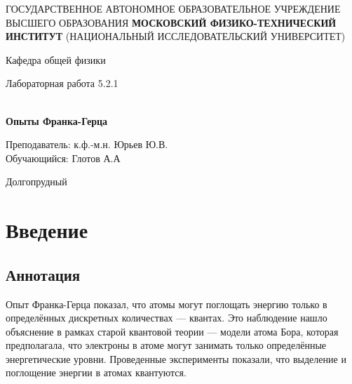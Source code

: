\documentclass[12pt,a4paper]{article}
\author{Глотов Алексей}
\begin{document}
\newpage
\begin{center}
\footnotesize{{ГОСУДАРСТВЕННОЕ АВТОНОМНОЕ ОБРАЗОВАТЕЛЬНОЕ УЧРЕЖДЕНИЕ}\break
{ВЫСШЕГО ОБРАЗОВАНИЯ}
\break
{\bf {МОСКОВСКИЙ ФИЗИКО-ТЕХНИЧЕСКИЙ ИНСТИТУТ}}
\break
\small{(НАЦИОНАЛЬНЫЙ ИССЛЕДОВАТЕЛЬСКИЙ УНИВЕРСИТЕТ)}}
\break
\hfill \break
\hfill \break
\begin{center}
\normalsize{Кафедра общей физики}
\end{center}
\hfill \break
\hfill \break
\hfill \break
\hfill \break

\begin{center}
\normalsize {Лабораторная работа 5.2.1}
\end{center}
\hfill \break\\
\large{\textbf{Опыты Франка-Герца}}
\end{center}
\begin{flushleft}
\hfill \break
\hfill \break
\hfill \break
\hfill \break
\hfill \break
\hfill \break
\hfill \break
\hfill \break
\hfill \break
\hfill \break
\hangindent=10cm
\normalsize{Преподаватель:} \;\;\;\;
\normalsize{к.ф.-м.н. Юрьев Ю.В.}\\
\hfill \break
\normalsize{Обучающийся:} \;\;\;\;\;
\normalsize{Глотов А.А} \\
\hfill \break
\end{flushleft}
\hfill \break
\hfill \break
\hfill \break
\hfill \break
\hfill \break
\hfill \break
\hfill \break
\hfill \break
\hfill \break
\hfill \break
\hfill \break

\begin{center}
Долгопрудный 
\end{center}

\thispagestyle{empty}


\newpage
\section{Введение}

\subsection{Аннотация}

Опыт Франка-Герца показал, что атомы могут поглощать энергию только в определённых дискретных количествах — квантах. Это наблюдение нашло объяснение в рамках старой квантовой теории — модели атома Бора, которая предполагала, что электроны в атоме могут занимать только определённые энергетические уровни. Проведенные эксперименты показали, что выделение и поглощение энергии в атомах квантуются.
\end{document}
